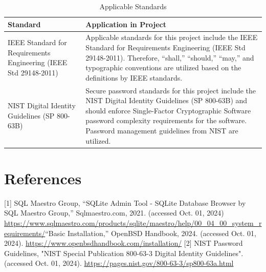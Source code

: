\documentclass[letterpaper,12pt,oneside,listof=totoc]{scrreprt}
\begin{document}
\begin{table}[h]
\centering
\caption{Applicable Standards}
\label{tab:ApplicableStandards}
\begin{tabular}{|p{5cm}|p{10cm}|}
\hline
\textbf{Standard} & \textbf{Application in Project} \\
\hline
IEEE Standard for Requirements Engineering (IEEE Std 29148-2011) & Applicable standards for this project include the IEEE Standard for Requirements Engineering (IEEE Std 29148-2011). Therefore, “shall,” “should,” “may,” and typographic conventions are utilized based on the definitions by IEEE standards. \\
\hline
NIST Digital Identity Guidelines (SP 800-63B) & Secure password standards for this project include the NIST Digital Identity Guidelines (SP 800-63B) and should enforce Single-Factor Cryptographic Software password complexity requirements for the software. Password management guidelines from NIST are utilized. \\
\hline
\end{tabular}
\end{table}

\section{References}
[1] SQL Maestro Group, “SQLite Admin Tool - SQLite Database Browser by SQL Maestro Group,” Sqlmaestro.com, 2021. (accessed Oct. 01, 2024) \url{https://www.sqlmaestro.com/products/sqlite/maestro/help/00_04_00_system_requirements/}\newline
[2] “Basic Installation,” OpenBSD Handbook, 2024. (accessed Oct. 01, 2024). \url{https://www.openbsdhandbook.com/installation/}
[2]  NIST Password Guidelines, "NIST Special Publication 800-63-3 Digital Identity Guidelines". (accessed Oct. 01, 2024). \url{‌https://pages.nist.gov/800-63-3/sp800-63a.html}
\end{document}
